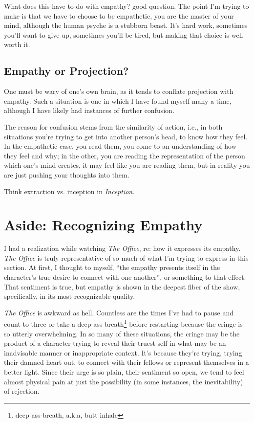 \documentclass[../butidigress.tex]{subfiles}
\begin{document}
What does this have to do with empathy? good question.
The point I'm trying to make is that we have to choose to be empathetic, you are the master of your mind, although the human psyche is a stubborn beast.
It's hard work, sometimes you'll want to give up, sometimes you'll be tired, but making that choice is well worth it.

\subsection{Empathy or Projection?}
One must be wary of one's own brain, as it tends to conflate projection with empathy.
Such a situation is one in which I have found myself many a time, although I have likely had instances of further confusion.

The reason for confusion stems from the similarity of action, i.e., in both situations you're trying to get into another person's head, to know how they feel.
In the empathetic case, you read them, you come to an understanding of how they feel and why; in the other, you are reading the representation of the person which one's mind creates, it may feel like you are reading them, but in reality you are just pushing your thoughts into them.

Think extraction vs. inception in \textit{Inception}.

\section{Aside: Recognizing Empathy}
I had a realization while watching \textit{The Office}, re: how it expresses its empathy.
\textit{The Office} is truly representative of so much of what I'm trying to express in this section.
At first, I thought to myself, ``the empathy presents itself in the character's true desire to connect with one another'', or something to that effect.
That sentiment is true, but empathy is shown in the deepest fiber of the show, specifically, in its most recognizable quality.

\textit{The Office} is awkward as hell.
Countless are the times I've had to pause and count to three or take a deep-ass breath\footnote{deep ass-breath, a.k.a, butt inhale} before restarting because the cringe is so utterly overwhelming.
In so many of these situations, the cringe may be the product of a character trying to reveal their truest self in what may be an inadvisable manner or inappropriate context.
It's because they're trying, trying their damned heart out, to connect with their fellows or represent themselves in a better light.
Since their urge is so plain, their sentiment so open, we tend to feel almost physical pain at just the possibility (in some instances, the inevitability) of rejection.
\end{document}
